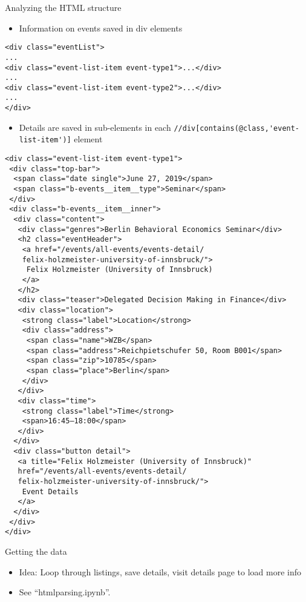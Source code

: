 \begin{frame}{Analyzing the HTML structure}
\begin{itemize}
	\item Information on events saved in div elements
\end{itemize}
\begin{verbatim}
<div class="eventList">
...
<div class="event-list-item event-type1">...</div>
...
<div class="event-list-item event-type2">...</div>
...
</div>
\end{verbatim}

\framebreak

\begin{itemize}
	\item Details are saved in sub-elements in each \verb!//div[contains(@class,'event-list-item')]! element
\end{itemize}
\begin{verbatim}
<div class="event-list-item event-type1">
 <div class="top-bar">
  <span class="date single">June 27, 2019</span>
  <span class="b-events__item__type">Seminar</span>
 </div>
 <div class="b-events__item__inner">
  <div class="content">
   <div class="genres">Berlin Behavioral Economics Seminar</div>
   <h2 class="eventHeader">
    <a href="/events/all-events/events-detail/
    felix-holzmeister-university-of-innsbruck/">
     Felix Holzmeister (University of Innsbruck)
    </a>
   </h2>
   <div class="teaser">Delegated Decision Making in Finance</div>
   <div class="location">
    <strong class="label">Location</strong>
    <div class="address">
     <span class="name">WZB</span>
     <span class="address">Reichpietschufer 50, Room B001</span>
     <span class="zip">10785</span>
     <span class="place">Berlin</span>
    </div>
   </div>
   <div class="time">
    <strong class="label">Time</strong>
    <span>16:45–18:00</span>
   </div>
  </div>
  <div class="button detail">
   <a title="Felix Holzmeister (University of Innsbruck)" 
   href="/events/all-events/events-detail/
   felix-holzmeister-university-of-innsbruck/">
    Event Details
   </a>
  </div>
 </div>
</div>
\end{verbatim}
\end{frame}

\begin{frame}{Getting the data}
\begin{itemize}
	\item Idea: Loop through listings, save details, visit details page to load more info
	\item See ``htmlparsing.ipynb''.
\end{itemize}
\end{frame}


